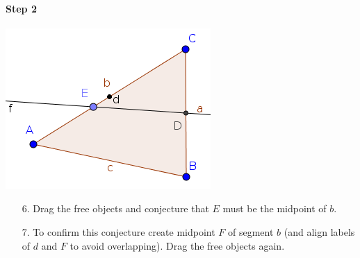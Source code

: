 \documentclass{article}
\begin{document}
\paragraph{Step 2}
\begin{center}
\includegraphics[scale=0.5]{classroom2}
\end{center}
\begin{enumerate}
    \item[6.] Drag the free objects and conjecture that $E$ must be the midpoint of $b$.
    \item[7.] To confirm this conjecture create midpoint $F$ of segment $b$ (and align labels of $d$ and $F$ to avoid overlapping). Drag the free objects again.
\end{enumerate}
\end{document}

